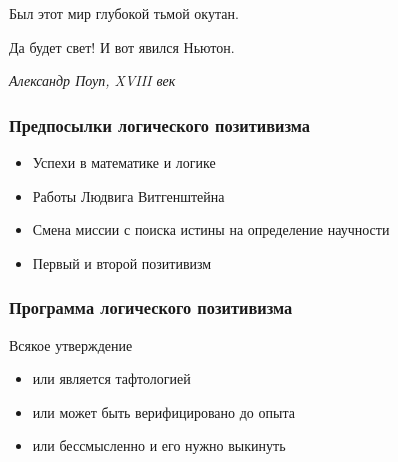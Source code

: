 \documentclass[aspectratio=169]{beamer}
\begin{document}






\begin{bframe}
\begin{center}
\begin{minipage}{10cm}
Был этот мир глубокой тьмой окутан.

Да будет свет! И вот явился Ньютон.

\begin{flushright}
{\it Александр Поуп, XVIII век}
\end{flushright}

\end{minipage}
\end{center}
\end{bframe}







\begin{bframe}\frametitle{Предпосылки логического позитивизма}
\begin{itemize}
\item Успехи в математике и логике
\item Работы Людвига Витгенштейна
\item Смена миссии с поиска истины на определение научности
\item Первый и второй позитивизм
\end{itemize}
\end{bframe}

\begin{bframe}\frametitle{Программа логического позитивизма}
Всякое утверждение
\begin{itemize}
\item или является тафтологией
\item или может быть верифицировано до опыта
\item или бессмысленно и его нужно выкинуть
\end{itemize}
\end{bframe}
\end{document}
